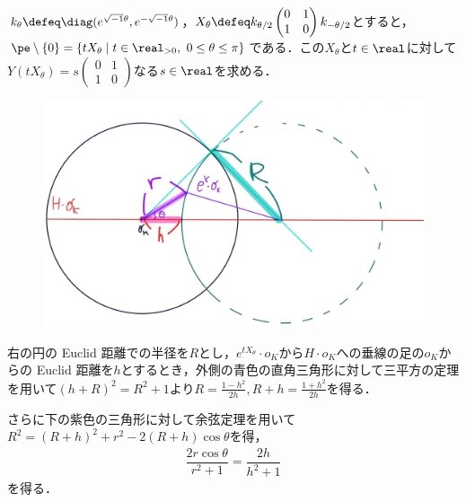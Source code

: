 \begin{pfwn}{}


  $k_{\theta} \defeq \diag(e^{\sqrt{-1}\theta},e^{-\sqrt{-1}\theta}) $，$X_{\theta} \defeq k_{\theta/2}
  \begin{pmatrix}
    0 & 1 \\ 1 & 0
  \end{pmatrix}
  k_{-\theta/2}$とすると，$\pe\setminus\{0\} =  \{tX_{\theta}\mid t\in \real_{>0},\ 0\leq \theta\leq \pi\}$である．この$X_{\theta} $と$t\in \real$に対して$Y(tX_{\theta} ) = s
  \begin{pmatrix}
    0 & 1 \\ 1 & 0
  \end{pmatrix}
  $なる$s\in \real $を求める．


   
  \begin{figure}[H]
    \centering
    \includegraphics[scale=0.08]{../graph/yosou-eg-1.jpg}
    \caption{}
    \label{fig:yosou-eg-1}
  \end{figure}

  右の円の Euclid 距離での半径を$R$とし，$e^{tX_{\theta}}\cdot o_K $から$H\cdot o_K$への垂線の足の$o_K$からの Euclid 距離を$h$とするとき，外側の青色の直角三角形に対して三平方の定理を用いて$(h+R)^2 = R^2 +  1 $より$R = \frac{1-h^2}{2h} , R+h = \frac{1+h^2}{2h}  $を得る．

  さらに下の紫色の三角形に対して余弦定理を用いて$R^2 = (R+h)^2 + r^2 - 2(R+h) \cos\theta  $を得，
  \begin{align}
    {\dfrac{2r\cos\theta}{r^2 + 1} = \dfrac{2h}{h^2 + 1} }\label{eq:1018-main}
  \end{align}
  を得る．

  
\end{pfwn}

